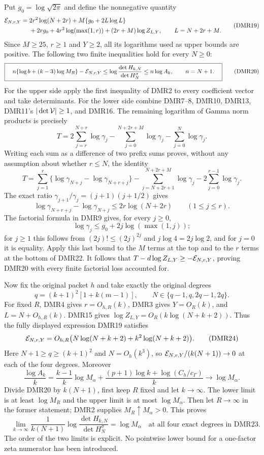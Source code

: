Put $g_0=\log\sqrt{2\pi}$ and define the nonnegative quantity
\[
 \begin{split}
 {\cal E}_{N,r,Y}={}&2r^2\log(N+2r)
     +M\{g_0+2L\log L\}\\
     &+2rg_0+4r^2\log(\max(1,r))
       +(2r+M)\log Z_{L,Y},
             \qquad L=N+2r+M.
 \end{split}\tag{DMR19}
\]
Since $M\geq25$, $r\geq1$ and $Y\geq2$, all its logarithms
used as upper bounds are positive. The following two finite
inequalities hold for every $N\geq0$:
\[
 \boxed{\quad
 n\{\log b+(k-3)\log M_R\}-{\cal E}_{N,r,Y}
 \leq
       \log\frac{\det H_{k,N}}{\det H_N^\sigma}
 \leq n\log A_k,\qquad n=N+1.
 \quad}\tag{DMR20}
\]
For the upper side apply the first inequality of DMR2 to every
coefficient vector and take determinants.
For the lower side combine DMR7--8, DMR10, DMR13,
DMR11's $|\det{\cal V}|\geq1$, and DMR16. The remaining
logarithm of Gamma norm products is precisely
\[
 T=2\sum_{j=r}^{N+r}\log\gamma_j
          -\sum_{j=0}^{N+2r+M}\log\gamma_j
          -\sum_{j=0}^N\log\gamma_j .
 \tag{DMR21}
\]
Writing each sum as a difference of two prefix sums proves,
without any assumption about whether $r\leq N$, the identity
\[
 T=\sum_{j=1}^r
      \{\log\gamma_{N+j}-\log\gamma_{N+r+j}\}
       -\sum_{j=N+2r+1}^{N+2r+M}\log\gamma_j
       -2\sum_{j=0}^{r-1}\log\gamma_j .
 \tag{DMR22}
\]
The exact ratio
$\gamma_{j+1}/\gamma_j=(j+1)(j+1/2)$ gives
\[
 \log\gamma_{N+r+j}-\log\gamma_{N+j}
 \leq2r\log(N+2r)\qquad(1\leq j\leq r).
\]
The factorial formula in DMR9 gives, for every $j\geq0$,
\[
 \log\gamma_j\leq g_0+2j\log(\max(1,j));
\]
for $j\geq1$ this follows from $(2j)!\leq(2j)^{2j}$ and
$j\log4=2j\log2$, and for $j=0$ it is equality.
Apply this last bound to the $M$ terms at the top and to
the $r$ terms at the bottom of DMR22. It follows that
$T-d\log Z_{L,Y}\geq-{\cal E}_{N,r,Y}$, proving DMR20
with every finite factorial loss accounted for.

Now fix the original packet $h$ and take exactly the original
degrees
\[
 q=(k+1)^2[1+k(m-1)],\qquad
 N\in\{q-1,q,2q-1,2q\}.
 \tag{DMR23}
\]
For fixed $R$, DMR4 gives $r=O_{h,R}(k)$, DMR3 gives
$Y=O_R(k)$, and $L=N+O_{h,R}(k)$. DMR15 gives
$\log Z_{L,Y}=O_R(k\log(N+k+2))$. Thus the fully displayed
expression DMR19 satisfies
\[
 {\cal E}_{N,r,Y}
     =O_{h,R}\bigl(N\log(N+k+2)+k^2\log(N+k+2)\bigr).
 \tag{DMR24}
\]
Here $N+1\geq q\geq(k+1)^2$ and $N=O_h(k^3)$, so
$ {\cal E}_{N,r,Y}/(k(N+1))\to0$ at each of the four degrees.
Moreover
\[
 \frac{\log A_k}{k}
  =\frac{k-1}{k}\log M_\alpha
      +\frac{(p+1)\log k+\log(C_h/c_\Gamma)}{k}
       \longrightarrow\log M_\alpha .
 \tag{DMR25}
\]
Divide DMR20 by $k(N+1)$, first keep $R$ fixed and let
$k\to\infty$. The lower limit is at least $\log M_R$ and
the upper limit is at most $\log M_\alpha$. Then let
$R\to\infty$ in the former statement; DMR2 supplies
$M_R\uparrow M_\alpha>0$. This proves
\[
 \boxed{\quad
 \lim_{k\to\infty}
  \frac{1}{k(N+1)}
       \log\frac{\det H_{k,N}}{\det H_N^\sigma}
       =\log M_\alpha
   \quad\text{at all four exact degrees in DMR23}.
 \quad}\tag{DMR26}
\]
The order of the two limits is explicit. No pointwise lower
bound for a one-factor zeta numerator has been introduced.

